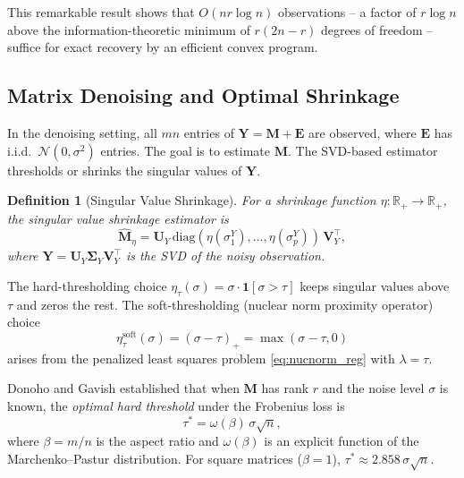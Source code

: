 \documentclass[conference]{IEEEtran}
\newtheorem{definition}{Definition}
\begin{document}
This remarkable result shows that $O(nr\log n)$ observations -- a factor of $r\log n$ above the information-theoretic minimum of $r(2n - r)$ degrees of freedom -- suffice for exact recovery by an efficient convex program.

\subsection{Matrix Denoising and Optimal Shrinkage}

In the denoising setting, all $mn$ entries of $\mathbf{Y} = \mathbf{M} + \mathbf{E}$ are observed, where $\mathbf{E}$ has i.i.d.\ $\mathcal{N}(0, \sigma^2)$ entries. The goal is to estimate $\mathbf{M}$. The SVD-based estimator thresholds or shrinks the singular values of $\mathbf{Y}$.

\begin{definition}[Singular Value Shrinkage]
  For a shrinkage function $\eta : \mathbb{R}_+ \to \mathbb{R}_+$, the \emph{singular value shrinkage estimator} is
  \begin{equation}
    \hat{\mathbf{M}}_\eta = \mathbf{U}_Y \, \mathrm{diag}(\eta(\sigma_1^Y), \ldots, \eta(\sigma_p^Y)) \, \mathbf{V}_Y^\top,
    \label{eq:shrink}
  \end{equation}
  where $\mathbf{Y} = \mathbf{U}_Y \boldsymbol{\Sigma}_Y \mathbf{V}_Y^\top$ is the SVD of the noisy observation.
\end{definition}

The hard-thresholding choice $\eta_\tau(\sigma) = \sigma \cdot \mathbf{1}[\sigma > \tau]$ keeps singular values above $\tau$ and zeros the rest. The soft-thresholding (nuclear norm proximity operator) choice
\begin{equation}
  \eta_\tau^{\mathrm{soft}}(\sigma) = (\sigma - \tau)_+ = \max(\sigma - \tau, 0)
  \label{eq:soft_thresh}
\end{equation}
arises from the penalized least squares problem \eqref{eq:nucnorm_reg} with $\lambda = \tau$.

Donoho and Gavish \cite{gavish2014optimal} established that when $\mathbf{M}$ has rank $r$ and the noise level $\sigma$ is known, the \emph{optimal hard threshold} under the Frobenius loss is
\begin{equation}
  \tau^* = \omega(\beta)\, \sigma \sqrt{n},
  \label{eq:optimal_thresh}
\end{equation}
where $\beta = m/n$ is the aspect ratio and $\omega(\beta)$ is an explicit function of the Marchenko--Pastur distribution. For square matrices ($\beta = 1$), $\tau^* \approx 2.858 \,\sigma\sqrt{n}$.
\end{document}
